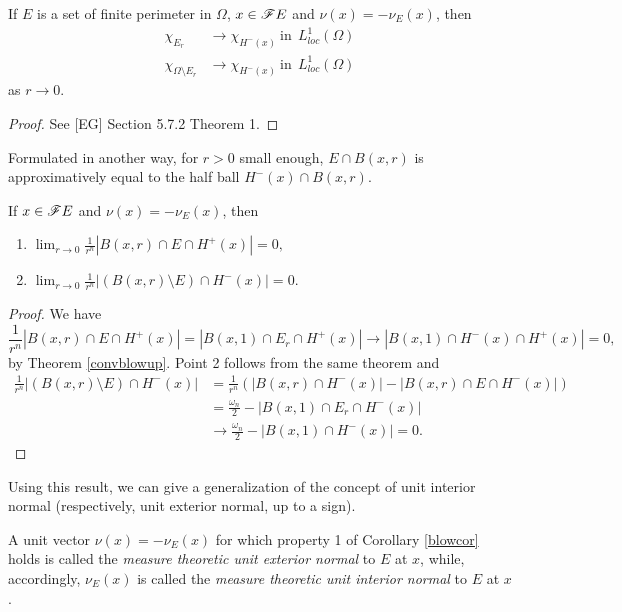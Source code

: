 \begin{theorem} \label{convblowup} If $E$ is a set of finite perimeter in $\Omega$, $x \in \mathscr{F} E$ and $\nu(x) = - \nu_{E}(x)$, then
\begin{align*} \chi_{E_{r}} & \to \chi_{H^{-}(x)}  \ \mathrm{in} \ \ L^{1}_{loc}(\Omega) \\
\chi_{\Omega \setminus E_{r}} & \to \chi_{H^{-}(x)}  \ \mathrm{in} \ \ L^{1}_{loc}(\Omega) \end{align*}
as $r \to 0$.
\end{theorem}

\begin{proof} See [EG] Section 5.7.2 Theorem 1.
\end{proof}

Formulated in another way, for $r > 0$ small enough, $E \cap B(x, r)$ is approximatively equal to the half ball $H^{-}(x) \cap B(x, r)$.

\begin{corollary} \label{blowcor} If $x \in \mathscr{F} E$ and $\nu(x) = - \nu_{E}(x)$, then
\begin{enumerate}
	\item $\displaystyle \lim_{r \to 0} \frac{1}{r^{n}} |B(x,r) \cap E \cap H^{+}(x)| = 0,$
	\item $\displaystyle \lim_{r \to 0} \frac{1}{r^{n}} |(B(x,r) \setminus E) \cap H^{-}(x)| = 0.$
\end{enumerate}
\end{corollary}
\begin{proof} We have 
\[\frac{1}{r^{n}} |B(x,r) \cap E \cap H^{+}(x)| = |B(x,1) \cap E_{r} \cap H^{+}(x)| \to |B(x,1) \cap H^{-}(x) \cap H^{+}(x)| = 0,\]
by Theorem \ref{convblowup}. Point 2 follows from the same theorem and 
\begin{align*} \frac{1}{r^{n}} |(B(x,r) \setminus E) \cap H^{-}(x)| & = \frac{1}{r^{n}} ( |B(x,r) \cap H^{-}(x)| - |B(x,r) \cap E \cap H^{-}(x)|) \\
& = \frac{\omega_{n}}{2} - |B(x,1) \cap E_{r} \cap H^{-}(x)| \\
& \to \frac{\omega_{n}}{2} - |B(x,1) \cap H^{-}(x)| = 0. \end{align*}
\end{proof}

Using this result, we can give a generalization of the concept of unit interior normal (respectively, unit exterior normal, up to a sign).

\begin{definition} A unit vector $\nu(x) = - \nu_{E}(x)$ for which property 1 of Corollary \ref{blowcor} holds is called the {\em measure theoretic unit exterior normal} to $E$ at $x$, while, accordingly, $\nu_{E}(x)$ is called the {\em measure theoretic unit interior normal} to $E$ at $x$.
\end{definition}

